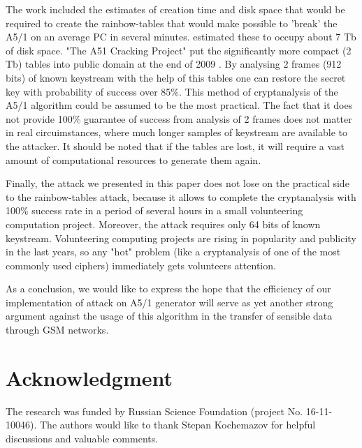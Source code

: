 \documentclass[runningheads,a4paper]{llncs}[2015/06/24]
\newcommand{\commentatside}[1]{\pdfcomment[color={0.045 0.278 0.643},icon=Note]{#1}}
\newcommand{\todo}[1]{\commentatside{#1}}
\begin{document}
The work \cite{COPAC_2} included the estimates of creation time and disk space
that would be required to create the rainbow-tables that would make possible to
'break' the A5/1 on an average PC in several minutes. \cite{COPAC_2} estimated
these to occupy about 7 Tb of disk space. "The A51 Cracking Project" put the
significantly more compact (2 Tb) tables into public domain at the end of 2009
\todo {cite what?}. By analysing 2 frames (912 bits) of known keystream with
the help of this tables one can restore the secret key with probability of
success over 85\%. This method of cryptanalysis of the A5/1 algorithm could be
assumed to be the most practical. The fact that it does not provide 100\%
guarantee of success from analysis of 2 frames does not matter in real
circuimstances, where much longer samples of keystream are available to the
attacker. It should be noted that if the tables are lost, it will require a
vast amount of computational resources to generate them again.

Finally, the attack we presented in this paper does not lose on the practical
side to the rainbow-tables attack, because it allows to complete the
cryptanalysis with 100\% success rate in a period of several hours in a small
volunteering computation project. Moreover, the attack requires only 64 bits of
known keystream. Volunteering computing projects are rising in popularity and
publicity in the last years, so any "hot" problem (like a cryptanalysis of one
of the most commonly used ciphers) immediately gets volunteers attention.

As a conclusion, we would like to express the hope that the efficiency of our
implementation of attack on A5/1 generator will serve as yet another strong
argument against the usage of this algorithm in the transfer of sensible data
through GSM networks.

\section*{Acknowledgment}
The research was funded by Russian Science Foundation (project No. 16-11-10046). The authors would like to thank Stepan Kochemazov for helpful discussions and valuable comments.



\end{document}
